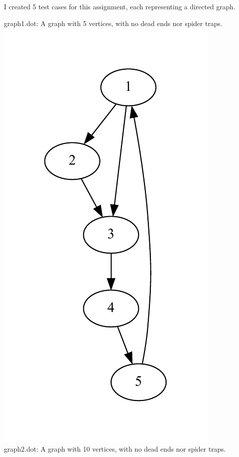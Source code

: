 \documentclass[9pt,twoside]{exam}
\begin{document}
I created 5 test cases for this assignment, each representing a directed graph. 
\begin{center}
graph1.dot: A graph with 5 vertices, with no dead ends nor spider traps. \\
\includegraphics[scale=0.5]{graph1.pdf} \\
graph2.dot: A graph with 10 vertices, with no dead ends nor spider traps. \\

\end{center}
\end{document}

